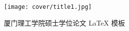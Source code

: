 \begin{titlepage}
\begin{center}

		\begin{figure*}[!ht]\vspace{0em}
			\centering
			\texttt{[image: cover/title1.jpg]}
		\end{figure*}
		
		
		\vspace{5em}
		\begin{center} {\erhao\hei 厦门理工学院硕士学位论文 \LaTeX{} 模板}\end{center}
		
		\vspace{10em}


\end{center}
\end{titlepage}
